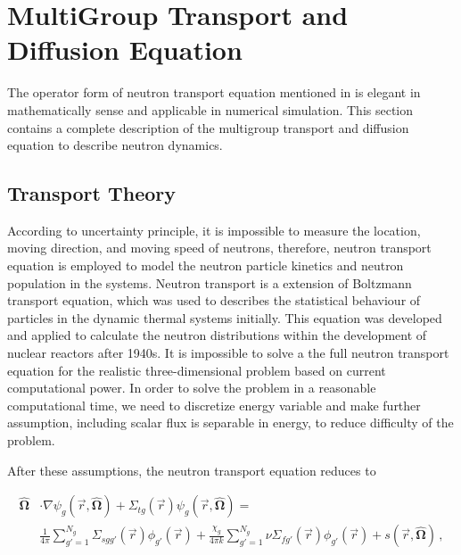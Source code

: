 
\cleardoublepage

\chapter{MultiGroup Transport and Diffusion Equation}
\label{chapter:multigroup}
The operator form of neutron transport equation mentioned in  is elegant in mathematically sense and applicable in numerical simulation.
This section contains a complete description of the multigroup transport and diffusion equation to describe neutron dynamics.

\section{Transport Theory}

According to uncertainty principle, it is impossible to measure the location, moving direction, and moving speed of neutrons, therefore, neutron transport equation is employed to model the neutron particle kinetics and neutron population in the systems.
Neutron transport is a extension of Boltzmann transport equation, which was used to describes the statistical behaviour of particles in the dynamic thermal systems initially.
This equation was developed and applied to calculate the neutron distributions within the development of nuclear reactors after 1940s.
It is impossible to solve a the full neutron transport equation for the realistic three-dimensional problem based on current computational power.
In order to solve the problem in a reasonable computational time, we need to discretize energy variable and make further assumption, including scalar flux is separable in energy, to reduce difficulty of the problem.

After these assumptions, the neutron transport equation reduces to

\begin{equation}
\begin{split}
  \bm{\hat{\Omega}} & \cdot \nabla \psi_g(\vec{r},\bm{\hat{\Omega}}) +
    \Sigma_{t g}(\vec{r}) \psi_{g}(\vec{r},\bm{\hat{\Omega}}) = \\
   & \frac{1}{4\pi} \sum\limits^{N_g}_{g'=1} \Sigma_{s g g'}(\vec{r}) \phi_{g'}(\vec{r}) +
    \frac{\chi_g}{4\pi k} \sum\limits^{N_g}_{g'=1} \nu\Sigma_{fg'}(\vec{r}) \phi_{g'}(\vec{r}) 
    + s(\vec{r},\bm{\hat{\Omega}})\, ,
\end{split}
\label{eq:transport}
\end{equation}

